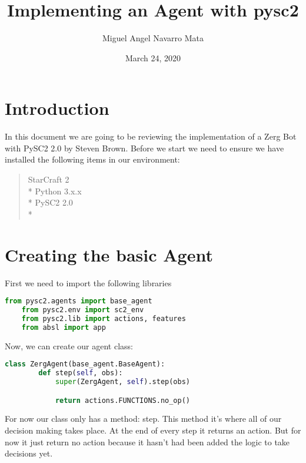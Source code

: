 \documentclass[11pt]{report}            %
\title{\bf Implementing an Agent with pysc2}  %
\author{Miguel Angel Navarro Mata}              %
\date{March 24, 2020}                           %
\begin{document}
\maketitle                              %
\setcounter{page}{2}                    %
\tableofcontents                        %

\newpage
\section{Introduction}
In this document we are going to be reviewing the implementation of a Zerg Bot with PySC2 2.0 by Steven Brown.
Before we start we need to ensure we have installed the following items in our environment:
\begin{quote}
StarCraft 2 \\*
Python 3.x.x \\*
PySC2 2.0 \\*
\end{quote}

\section{Creating the basic Agent}
First we need to import the following libraries
\begin{lstlisting}[language=Python]
    from pysc2.agents import base_agent
    from pysc2.env import sc2_env
    from pysc2.lib import actions, features
    from absl import app
\end{lstlisting}

Now, we can create our agent class:
\begin{lstlisting}[language=Python]
    class ZergAgent(base_agent.BaseAgent):
        def step(self, obs):
            super(ZergAgent, self).step(obs)

            return actions.FUNCTIONS.no_op()
\end{lstlisting}
For now our class only has a method: step. This method it's where all of our decision making takes place. At the end of every step it returns an action. But for now it just return no action because it hasn't had been added the logic to take decisions yet.
\end{document}
